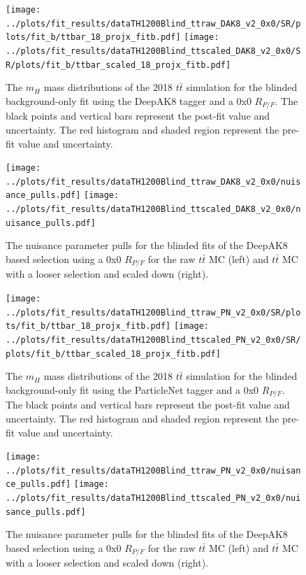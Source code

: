 \documentclass[10pt,oneside]{article}
\begin{document}
\begin{figure}[H]
    \centering
    \texttt{[image: ../plots/fit\_results/dataTH1200Blind\_ttraw\_DAK8\_v2\_0x0/SR/plots/fit\_b/ttbar\_18\_projx\_fitb.pdf]}
    \texttt{[image: ../plots/fit\_results/dataTH1200Blind\_ttscaled\_DAK8\_v2\_0x0/SR/plots/fit\_b/ttbar\_scaled\_18\_projx\_fitb.pdf]}
    \caption{The $m_H$ mass distributions of the 2018 $t\bar{t}$ simulation for the blinded background-only fit using the DeepAK8 tagger and a 0x0 $R_{P/F}$.
    The black points and vertical bars represent the post-fit value and uncertainty. The red histogram and shaded region represent the pre-fit value and uncertainty.}
    \label{figs:ttbarScaleCompDAK8}
\end{figure}
\begin{figure}[H]
    \centering
    \texttt{[image: ../plots/fit\_results/dataTH1200Blind\_ttraw\_DAK8\_v2\_0x0/nuisance\_pulls.pdf]}
    \texttt{[image: ../plots/fit\_results/dataTH1200Blind\_ttscaled\_DAK8\_v2\_0x0/nuisance\_pulls.pdf]}
    \caption{The nuisance parameter pulls for the blinded fits of the DeepAK8 based selection using a 0x0 $R_{P/F}$ for the raw $t\bar{t}$ MC (left) and 
    $t\bar{t}$ MC with a looser selection and scaled down (right).}
    \label{figs:ttbarScaleNuisCompDAK8}
\end{figure}

\begin{figure}[H]
    \centering
    \texttt{[image: ../plots/fit\_results/dataTH1200Blind\_ttraw\_PN\_v2\_0x0/SR/plots/fit\_b/ttbar\_18\_projx\_fitb.pdf]}
    \texttt{[image: ../plots/fit\_results/dataTH1200Blind\_ttscaled\_PN\_v2\_0x0/SR/plots/fit\_b/ttbar\_scaled\_18\_projx\_fitb.pdf]}
    \caption{The $m_H$ mass distributions of the 2018 $t\bar{t}$ simulation for the blinded background-only fit using the ParticleNet tagger and a 0x0 $R_{P/F}$.
    The black points and vertical bars represent the post-fit value and uncertainty. The red histogram and shaded region represent the pre-fit value and uncertainty.}
    \label{figs:ttbarScaleCompPN}
\end{figure}
\begin{figure}[H]
    \centering
    \texttt{[image: ../plots/fit\_results/dataTH1200Blind\_ttraw\_PN\_v2\_0x0/nuisance\_pulls.pdf]}
    \texttt{[image: ../plots/fit\_results/dataTH1200Blind\_ttscaled\_PN\_v2\_0x0/nuisance\_pulls.pdf]}
    \caption{The nuisance parameter pulls for the blinded fits of the DeepAK8 based selection using a 0x0 $R_{P/F}$ for the raw $t\bar{t}$ MC (left) and 
    $t\bar{t}$ MC with a looser selection and scaled down (right).}
    \label{figs:ttbarScaleNuisCompPN}
\end{figure}
\end{document}
